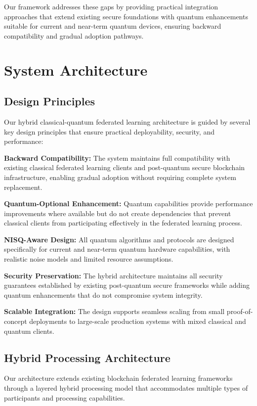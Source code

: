 \documentclass[10pt,journal,compsoc]{IEEEtran}
\begin{document}
Our framework addresses these gaps by providing practical integration approaches that extend existing secure foundations with quantum enhancements suitable for current and near-term quantum devices, ensuring backward compatibility and gradual adoption pathways.

\section{System Architecture}

\subsection{Design Principles}

Our hybrid classical-quantum federated learning architecture is guided by several key design principles that ensure practical deployability, security, and performance:

\textbf{Backward Compatibility:} The system maintains full compatibility with existing classical federated learning clients and post-quantum secure blockchain infrastructure, enabling gradual adoption without requiring complete system replacement.

\textbf{Quantum-Optional Enhancement:} Quantum capabilities provide performance improvements where available but do not create dependencies that prevent classical clients from participating effectively in the federated learning process.

\textbf{NISQ-Aware Design:} All quantum algorithms and protocols are designed specifically for current and near-term quantum hardware capabilities, with realistic noise models and limited resource assumptions.

\textbf{Security Preservation:} The hybrid architecture maintains all security guarantees established by existing post-quantum secure frameworks while adding quantum enhancements that do not compromise system integrity.

\textbf{Scalable Integration:} The design supports seamless scaling from small proof-of-concept deployments to large-scale production systems with mixed classical and quantum clients.

\subsection{Hybrid Processing Architecture}

Our architecture extends existing blockchain federated learning frameworks through a layered hybrid processing model that accommodates multiple types of participants and processing capabilities.
\end{document}
